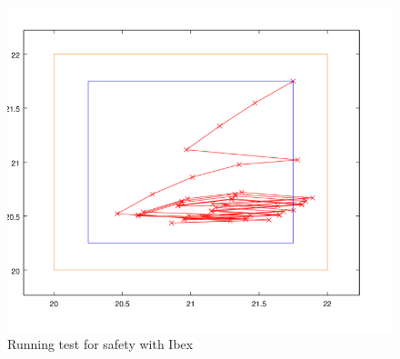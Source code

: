 \documentclass[a4paper,12pt]{book}
\begin{document}
    \begin{figure}
        \includegraphics[width=\linewidth]{11.png}
        \caption{Running test for safety with Ibex}
        \label{fig:1}
    \end{figure}





    



    
\end{document}
